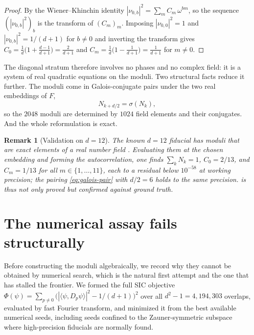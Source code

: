\documentclass[12pt,a4paper]{article}
\newtheorem{remark}[theorem]{Remark}
\newcommand{\Fd}{F}
\begin{document}
\begin{proof}
By the Wiener--Khinchin identity $|\nu_{0,b}|^2 = \sum_m C_m\,\omega^{bm}$, so the
sequence $(|\nu_{0,b}|^2)_b$ is the transform of $(C_m)_m$. Imposing
$|\nu_{0,0}|^2 = 1$ and $|\nu_{0,b}|^2 = 1/(d+1)$ for $b\neq 0$ and inverting the
transform gives $C_0 = \tfrac1d\big(1 + \tfrac{d-1}{d+1}\big) = \tfrac{2}{d+1}$
and $C_m = \tfrac1d\big(1 - \tfrac{1}{d+1}\big) = \tfrac1{d+1}$ for $m\neq 0$.
\end{proof}

The diagonal stratum therefore involves no phases and no complex field: it is a
system of real quadratic equations on the moduli. Two structural facts reduce it
further. The moduli come in Galois-conjugate pairs under the two real
embeddings of $\Fd$,
\begin{equation}
\label{eq:galois-pair}
N_{k+d/2} = \sigma(N_k),
\end{equation}
so the $2048$ moduli are determined by $1024$ field elements and their
conjugates. And the whole reformulation is exact.

\begin{remark}[Validation on $d=12$]
\label{rem:d12-autocorr}
The known $d=12$ fiducial has moduli that are exact elements of a real number
field \cite{Appleby2013}. Evaluating them at the chosen embedding and forming
the autocorrelation, one finds $\sum_k N_k = 1$, $C_0 = 2/13$, and
$C_m = 1/13$ for all $m\in\{1,\dots,11\}$, each to a residual below $10^{-58}$
at working precision; the pairing \eqref{eq:galois-pair} with $d/2=6$ holds to
the same precision.  is thus not only proved but confirmed
against ground truth.
\end{remark}

\section{The numerical assay fails structurally}
\label{sec:numeric}

Before constructing the moduli algebraically, we record why they cannot be
obtained by numerical search, which is the natural first attempt and the one
that has stalled the frontier. We formed the full SIC objective
$\Phi(\psi) = \sum_{p\neq 0}\big(|\langle\psi,D_p\psi\rangle|^2 - 1/(d+1)\big)^2$
over all $d^2-1 = 4{,}194{,}303$ overlaps, evaluated by fast Fourier transform,
and minimized it from the best available numerical seeds, including seeds
confined to the Zauner-symmetric subspace where high-precision fiducials are
normally found.
\end{document}
